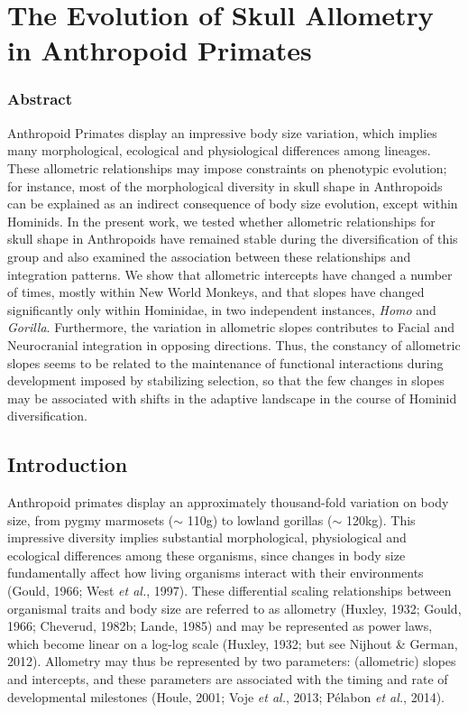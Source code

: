 \documentclass[12pt,twoside]{report}
\begin{document}
\newpage
\chapter{The Evolution of Skull Allometry in Anthropoid Primates}
\label{ch:allo}

\subsection{Abstract}\label{abstract-1}

Anthropoid Primates display an impressive body size variation, which
implies many morphological, ecological and physiological differences
among lineages. These allometric relationships may impose constraints on
phenotypic evolution; for instance, most of the morphological diversity
in skull shape in Anthropoids can be explained as an indirect
consequence of body size evolution, except within Hominids. In the
present work, we tested whether allometric relationships for skull shape
in Anthropoids have remained stable during the diversification of this
group and also examined the association between these relationships and
integration patterns. We show that allometric intercepts have changed a
number of times, mostly within New World Monkeys, and that slopes have
changed significantly only within Hominidae, in two independent
instances, \emph{Homo} and \emph{Gorilla}. Furthermore, the variation in
allometric slopes contributes to Facial and Neurocranial integration in
opposing directions. Thus, the constancy of allometric slopes seems to
be related to the maintenance of functional interactions during
development imposed by stabilizing selection, so that the few changes in
slopes may be associated with shifts in the adaptive landscape in the
course of Hominid diversification.

\newpage

\section{Introduction}\label{introduction-1}

Anthropoid primates display an approximately thousand-fold variation on
body size, from pygmy marmosets ($\sim$ 110g) to lowland gorillas
($\sim$ 120kg). This impressive diversity implies substantial
morphological, physiological and ecological differences among these
organisms, since changes in body size fundamentally affect how living
organisms interact with their environments (Gould, 1966; West \emph{et
al.}, 1997). These differential scaling relationships between organismal
traits and body size are referred to as allometry (Huxley, 1932; Gould,
1966; Cheverud, 1982b; Lande, 1985) and may be represented as power
laws, which become linear on a log-log scale (Huxley, 1932; but see
Nijhout \& German, 2012). Allometry may thus be represented by two
parameters: (allometric) slopes and intercepts, and these parameters are
associated with the timing and rate of developmental milestones (Houle,
2001; Voje \emph{et al.}, 2013; Pélabon \emph{et al.}, 2014).
\end{document}
